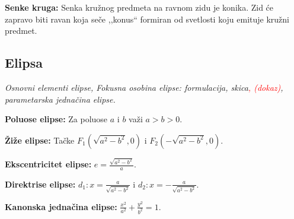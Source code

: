 \documentclass[12pt]{article}
\newcommand{\ocena}[1]{\textcolor{red}{#1}}
\begin{document}
\textbf{Senke kruga:} Senka kružnog predmeta na ravnom zidu je konika. Zid
će zapravo biti ravan koja seče ,,konus`` formiran od svetlosti koju emituje
kružni predmet.

\subsection{Elipsa}
\textit{Osnovni elementi elipse, Fokusna osobina elipse: formulacija,
    skica\ocena{, (dokaz)}, parametarska jednačina elipse.}
\par
\vspace*{1cm}

\textbf{Poluose elipse:} Za poluose $a$ i $b$ važi $a>b>0$.
\par

\textbf{Žiže elipse:} Tačke $F_1(\sqrt{a^2-b^2},0)$ i $F_2(-\sqrt{a^2-b^2},0)$.
\par

\textbf{Ekscentricitet elipse:} $e=\frac{\sqrt{a^2-b^2}}{a}$.
\par

\textbf{Direktrise elipse:} $d_1: x=\frac{a}{\sqrt{a^2-b^2}}$ i
$d_2: x=-\frac{a}{\sqrt{a^2-b^2}}$.
\par

\textbf{Kanonska jednačina elipse:} $\frac{x^2}{a^2}+\frac{y^2}{b^2}=1$.
\par
\end{document}
